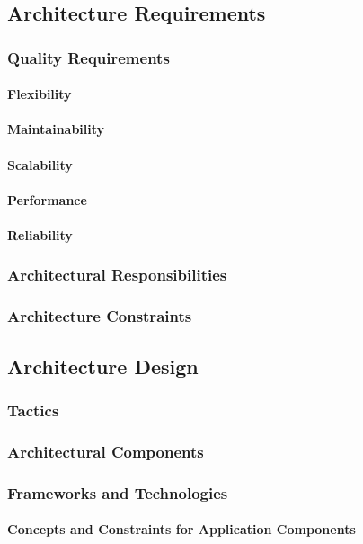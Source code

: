 
\subsection{Architecture Requirements}


\subsubsection{Quality Requirements}
\paragraph{Flexibility}


\paragraph{Maintainability}


\paragraph{Scalability}


\paragraph{Performance}


\paragraph{Reliability}


\subsubsection{Architectural Responsibilities}


\subsubsection{Architecture Constraints}


\subsection{Architecture Design}
\subsubsection{Tactics}

\subsubsection{Architectural Components}

\subsubsection{Frameworks and Technologies}

\paragraph{Concepts and Constraints for Application Components}
